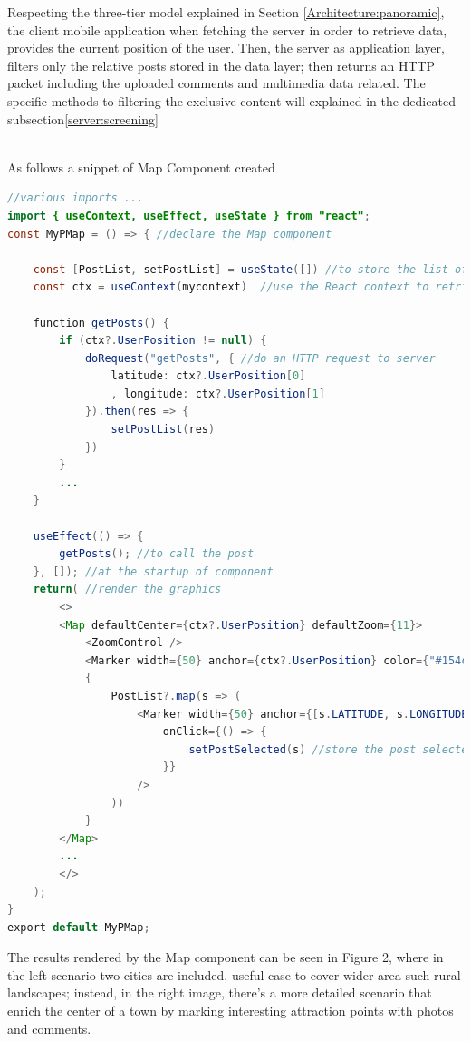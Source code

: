 \documentclass[conference]{IEEEtran}
\begin{document}
Respecting the three-tier model explained in Section \ref{Architecture:panoramic}, the client mobile application when fetching the server in order to retrieve data, provides the current position of the user. Then, the server as application layer, filters only the relative posts stored in the data layer; then returns an HTTP packet including the uploaded comments and multimedia data related.
The specific methods to filtering the exclusive content will explained in the dedicated subsection\ref{server:screening}


\\
As follows a snippet of Map Component created
\begin{lstlisting}[language=Java, caption=Map component snippet]
//various imports ...
import { useContext, useEffect, useState } from "react";
const MyPMap = () => { //declare the Map component

    const [PostList, setPostList] = useState([]) //to store the list of posts
    const ctx = useContext(mycontext)  //use the React context to retrieve data of other components
    
    function getPosts() {
        if (ctx?.UserPosition != null) {
            doRequest("getPosts", { //do an HTTP request to server
                latitude: ctx?.UserPosition[0]
                , longitude: ctx?.UserPosition[1]
            }).then(res => {
                setPostList(res)
            })
        } 
        ...
    }
    
    useEffect(() => {
        getPosts(); //to call the post
    }, []); //at the startup of component
    return( //render the graphics
        <>
        <Map defaultCenter={ctx?.UserPosition} defaultZoom={11}>
            <ZoomControl />
            <Marker width={50} anchor={ctx?.UserPosition} color={"#154c79"} />
            {
                PostList?.map(s => (
                    <Marker width={50} anchor={[s.LATITUDE, s.LONGITUDE]} color={(s?.MEDIATYPE?.length > 0) ? '#d6c531' : '#f23c3c'}
                        onClick={() => {
                            setPostSelected(s) //store the post selected to open it in the opportuned component (viewPost)
                        }}
                    />
                ))
            }
        </Map>
        ...
        </>
    );
}
export default MyPMap;
\end{lstlisting}

The results rendered by the Map component can be seen in Figure 2, where in the left scenario two cities are included, useful case to cover wider area such rural landscapes; instead, in the right image, there's a more detailed scenario that enrich the center of a town by marking interesting attraction points with photos and comments.
\end{document}
